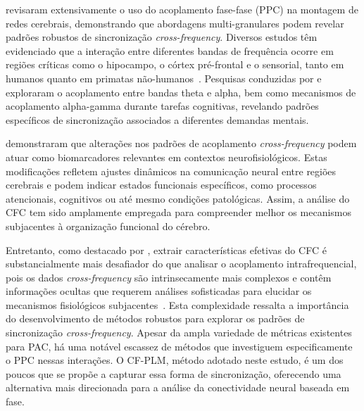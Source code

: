  revisaram extensivamente o uso do acoplamento fase-fase (PPC) na montagem de redes cerebrais, demonstrando que abordagens multi-granulares podem revelar padrões robustos de sincronização \textit{cross-frequency}. Diversos estudos têm evidenciado que a interação entre diferentes bandas de frequência ocorre em regiões críticas como o hipocampo, o córtex pré-frontal e o sensorial, tanto em humanos quanto em primatas não-humanos~\cite{mormann2005phase, canolty2006high, jensen2007cross, khamechian2020decoding}. Pesquisas conduzidas por  e  exploraram o acoplamento entre bandas theta e alpha, bem como mecanismos de acoplamento alpha-gamma durante tarefas cognitivas, revelando padrões específicos de sincronização associados a diferentes demandas mentais.

 demonstraram que alterações nos padrões de acoplamento \textit{cross-frequency} podem atuar como biomarcadores relevantes em contextos neurofisiológicos. Estas modificações refletem ajustes dinâmicos na comunicação neural entre regiões cerebrais e podem indicar estados funcionais específicos, como processos atencionais, cognitivos ou até mesmo condições patológicas. Assim, a análise do CFC tem sido amplamente empregada para compreender melhor os mecanismos subjacentes à organização funcional do cérebro.

Entretanto, como destacado por , extrair características efetivas do CFC é substancialmente mais desafiador do que analisar o acoplamento intrafrequencial, pois os dados \textit{cross-frequency} são intrinsecamente mais complexos e contêm informações ocultas que requerem análises sofisticadas para elucidar os mecanismos fisiológicos subjacentes~\cite{ren2022multi}. Esta complexidade ressalta a importância do desenvolvimento de métodos robustos para explorar os padrões de sincronização \textit{cross-frequency}. Apesar da ampla variedade de métricas existentes para PAC, há uma notável escassez de métodos que investiguem especificamente o PPC nessas interações. O CF-PLM, método adotado neste estudo, é um dos poucos que se propõe a capturar essa forma de sincronização, oferecendo uma alternativa mais direcionada para a análise da conectividade neural baseada em fase.

